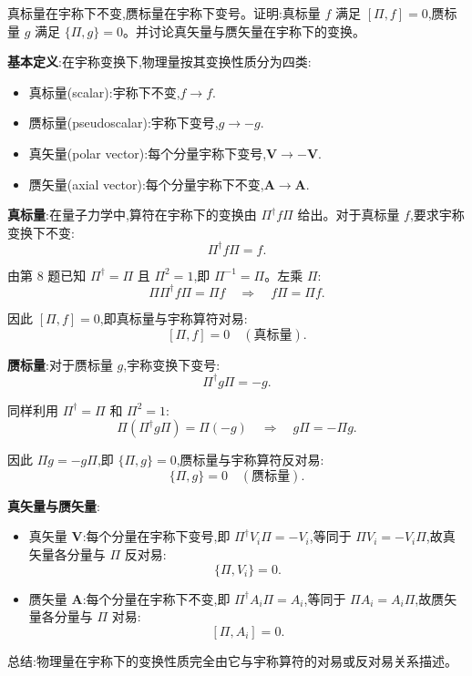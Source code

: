 \begin{question}
真标量在宇称下不变,赝标量在宇称下变号。证明:真标量 $f$ 满足 $[\Pi,f]=0$,赝标量 $g$ 满足 $\{\Pi,g\}=0$。并讨论真矢量与赝矢量在宇称下的变换。
\end{question}
\begin{solution}
	\textbf{基本定义}:在宇称变换下,物理量按其变换性质分为四类:
	\begin{itemize}
	\item 真标量(scalar):宇称下不变,$f\to f$.
	\item 赝标量(pseudoscalar):宇称下变号,$g\to -g$.
	\item 真矢量(polar vector):每个分量宇称下变号,$\mathbf V\to -\mathbf V$.
	\item 赝矢量(axial vector):每个分量宇称下不变,$\mathbf A\to \mathbf A$.
	\end{itemize}

	\textbf{真标量}:在量子力学中,算符在宇称下的变换由 $\Pi^\dagger f\Pi$ 给出。对于真标量 $f$,要求宇称变换下不变:
	\[
	\Pi^\dagger f\Pi = f.
	\]

	由第 8 题已知 $\Pi^\dagger=\Pi$ 且 $\Pi^2=1$,即 $\Pi^{-1}=\Pi$。左乘 $\Pi$:
	\[
	\Pi\Pi^\dagger f\Pi = \Pi f \quad\Longrightarrow\quad f\Pi = \Pi f.
	\]

	因此 $[\Pi, f]=0$,即真标量与宇称算符对易:
	\[
	\boxed{[\Pi,f]=0\quad(\text{真标量})}.
	\]

	\textbf{赝标量}:对于赝标量 $g$,宇称变换下变号:
	\[
	\Pi^\dagger g\Pi = -g.
	\]

	同样利用 $\Pi^\dagger=\Pi$ 和 $\Pi^2=1$:
	\[
	\Pi(\Pi^\dagger g\Pi)=\Pi(-g) \quad\Longrightarrow\quad g\Pi = -\Pi g.
	\]

	因此 $\Pi g = -g\Pi$,即 $\{\Pi,g\}=0$,赝标量与宇称算符反对易:
	\[
	\boxed{\{\Pi,g\}=0\quad(\text{赝标量})}.
	\]

	\textbf{真矢量与赝矢量}:
	\begin{itemize}
	\item 真矢量 $\mathbf V$:每个分量在宇称下变号,即 $\Pi^\dagger V_i\Pi = -V_i$,等同于 $\Pi V_i = -V_i\Pi$,故真矢量各分量与 $\Pi$ 反对易:
	\[
	\{\Pi,V_i\}=0.
	\]
	\item 赝矢量 $\mathbf A$:每个分量在宇称下不变,即 $\Pi^\dagger A_i\Pi = A_i$,等同于 $\Pi A_i = A_i\Pi$,故赝矢量各分量与 $\Pi$ 对易:
	\[
	[\Pi,A_i]=0.
	\]
	\end{itemize}

	总结:物理量在宇称下的变换性质完全由它与宇称算符的对易或反对易关系描述。
	\end{solution}

